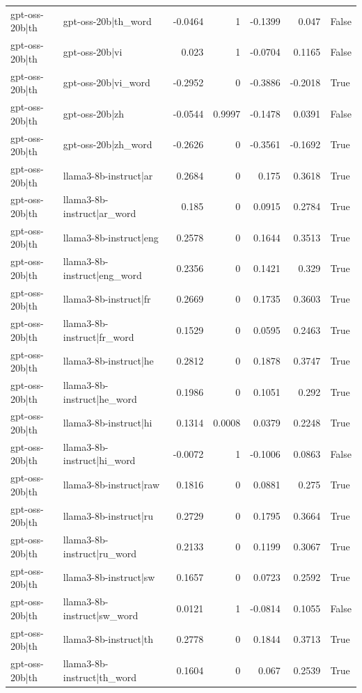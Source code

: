 \begin{table}
\begin{tabular}{l l r r r r l}
gpt-oss-20b|th & gpt-oss-20b|th_word & -0.0464 & 1 & -0.1399 & 0.047 & False \\
gpt-oss-20b|th & gpt-oss-20b|vi & 0.023 & 1 & -0.0704 & 0.1165 & False \\
gpt-oss-20b|th & gpt-oss-20b|vi_word & -0.2952 & 0 & -0.3886 & -0.2018 & True \\
gpt-oss-20b|th & gpt-oss-20b|zh & -0.0544 & 0.9997 & -0.1478 & 0.0391 & False \\
gpt-oss-20b|th & gpt-oss-20b|zh_word & -0.2626 & 0 & -0.3561 & -0.1692 & True \\
gpt-oss-20b|th & llama3-8b-instruct|ar & 0.2684 & 0 & 0.175 & 0.3618 & True \\
gpt-oss-20b|th & llama3-8b-instruct|ar_word & 0.185 & 0 & 0.0915 & 0.2784 & True \\
gpt-oss-20b|th & llama3-8b-instruct|eng & 0.2578 & 0 & 0.1644 & 0.3513 & True \\
gpt-oss-20b|th & llama3-8b-instruct|eng_word & 0.2356 & 0 & 0.1421 & 0.329 & True \\
gpt-oss-20b|th & llama3-8b-instruct|fr & 0.2669 & 0 & 0.1735 & 0.3603 & True \\
gpt-oss-20b|th & llama3-8b-instruct|fr_word & 0.1529 & 0 & 0.0595 & 0.2463 & True \\
gpt-oss-20b|th & llama3-8b-instruct|he & 0.2812 & 0 & 0.1878 & 0.3747 & True \\
gpt-oss-20b|th & llama3-8b-instruct|he_word & 0.1986 & 0 & 0.1051 & 0.292 & True \\
gpt-oss-20b|th & llama3-8b-instruct|hi & 0.1314 & 0.0008 & 0.0379 & 0.2248 & True \\
gpt-oss-20b|th & llama3-8b-instruct|hi_word & -0.0072 & 1 & -0.1006 & 0.0863 & False \\
gpt-oss-20b|th & llama3-8b-instruct|raw & 0.1816 & 0 & 0.0881 & 0.275 & True \\
gpt-oss-20b|th & llama3-8b-instruct|ru & 0.2729 & 0 & 0.1795 & 0.3664 & True \\
gpt-oss-20b|th & llama3-8b-instruct|ru_word & 0.2133 & 0 & 0.1199 & 0.3067 & True \\
gpt-oss-20b|th & llama3-8b-instruct|sw & 0.1657 & 0 & 0.0723 & 0.2592 & True \\
gpt-oss-20b|th & llama3-8b-instruct|sw_word & 0.0121 & 1 & -0.0814 & 0.1055 & False \\
gpt-oss-20b|th & llama3-8b-instruct|th & 0.2778 & 0 & 0.1844 & 0.3713 & True \\
gpt-oss-20b|th & llama3-8b-instruct|th_word & 0.1604 & 0 & 0.067 & 0.2539 & True \\

\end{tabular}
\end{table}
